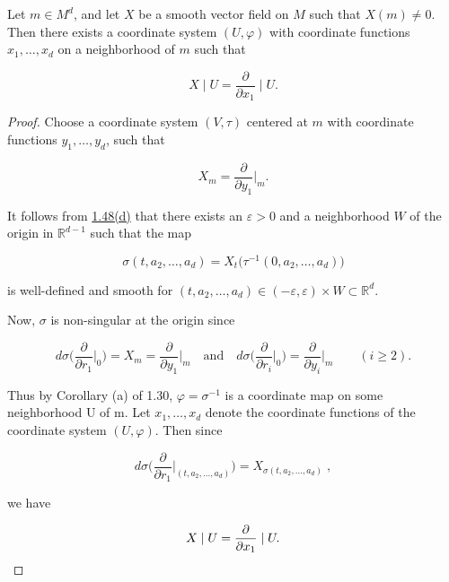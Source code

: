 \begin{proposition}\label{thm:1.53}
	Let $m \in M^{d}$, and let $X$ be a smooth vector field on $M$ such that $X(m) \neq 0$. Then there exists a coordinate system $(U, \varphi)$ with coordinate functions $x_{1}, \ldots, x_{d}$ on a neighborhood of $m$ such that

	\begin{equation}
		\tag{1}\label{eq:1.53:1}
		X\mid U=\frac{\partial}{\partial x_{1}}\mid U.
	\end{equation}

\end{proposition}

\begin{proof}
	Choose a coordinate system $(V,\tau)$ centered at $m$ with coordinate functions $y_{1},\ldots,y_{d}$, such that

	\begin{equation}
		\tag{2}\label{eq:1.53:2}
		X_{m}=\frac{\partial}{\partial y_{1}}\Big|_{m}.
	\end{equation}

	It follows from \hyperref[thm:1.48]{1.48(d)} that there exists an $\varepsilon>0$ and a neighborhood $W$ of the origin in $\mathbb{R}^{d-1}$ such that the map

	\[
		\sigma(t,a_{2},\ldots,a_{d})=X_{t}\big(\tau^{-1}(0,a_{2},\ldots,a_{d})\big)
	\]

	is well-defined and smooth for $(t, a_{2}, \ldots, a_{d}) \in (-\varepsilon, \varepsilon) \times W \subset \mathbb{R}^{d}$.

	Now,  $ \sigma $ is non-singular at the origin since

	\[
		d\sigma\bigg(\frac{\partial}{\partial r_{1}}\bigg|_{0}\bigg)=X_{m}=\frac{\partial}{\partial y_{1}}\bigg|_{m}\quad\mathrm{and}\quad d\sigma\bigg(\frac{\partial}{\partial r_{i}}\bigg|_{0}\bigg)=\frac{\partial}{\partial y_{i}}\bigg|_{m}\qquad(i\geq2).
	\]

	Thus by Corollary (a) of 1.30,  $ \varphi = \sigma^{-1} $ is a coordinate map on some neighborhood U of m. Let  $ x_1, \ldots, x_d $ denote the coordinate functions of the coordinate system  $ (U, \varphi) $. Then since

	\[
		d\sigma\bigg(\frac{\partial}{\partial r_{1}}\bigg|_{(t,a_{2},\ldots,a_{d})}\bigg)=X_{\sigma(t,a_{2},\ldots,a_{d})}\;,
	\]

	we have

	\[
		X\mid U=\frac{\partial}{\partial x_{1}}\mid U.
		\qedhere
	\]
\end{proof}

